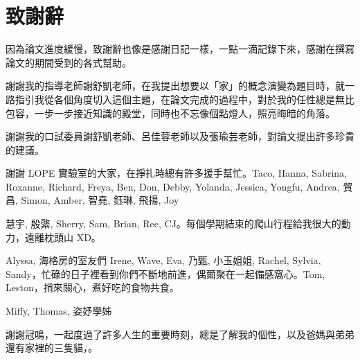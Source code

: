 

\chapter*{致謝辭}
因為論文進度緩慢，致謝辭也像是感謝日記一樣，一點一滴記錄下來，感謝在撰寫論文的期間受到的各式幫助。

謝謝我的指導老師謝舒凱老師，在我提出想要以「家」的概念演變為題目時，就一路指引我從各個角度切入這個主題，在論文完成的過程中，對於我的任性總是無比包容，一步一步接近知識的殿堂，同時也不忘像個點燈人，照亮晦暗的角落。

謝謝我的口試委員謝舒凱老師、呂佳蓉老師以及張瑜芸老師，對論文提出許多珍貴的建議。

謝謝 LOPE 實驗室的大家，在掙扎時總有許多援手幫忙。Taco, Hanna, Sabrina, Roxanne, Richard, Freya, Ben, Don, Debby, Yolanda, Jessica, Yongfu, Andrea, 貿昌, Simon, Amber, 智堯, 鈺琳, 飛揚, Joy

慧宇, 殷綮, Sherry, Sam, Brian, Ree, CJ。每個學期結束的爬山行程給我很大的動力，遠離枕頭山 XD。

Alyssa, 海格房的室友們 Irene, Wave, Eva, 乃甄, 小玉姐姐, Rachel, Sylvia, Sandy，忙碌的日子裡看到你們不斷地前進，偶爾聚在一起備感窩心。Tom, Leston，捎來關心，煮好吃的食物共食。

Miffy, Thomas, 姿妤學姊


謝謝冠鳴，一起度過了許多人生的重要時刻，總是了解我的個性，以及爸媽與弟弟還有家裡的三隻貓，。


